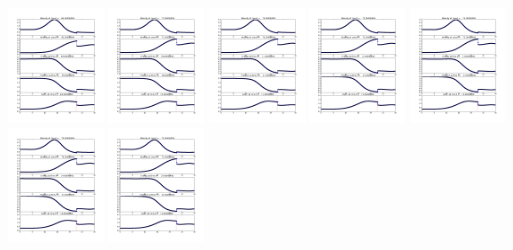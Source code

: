 \documentclass[11pt]{article}
\begin{document}
\vskip 10pt 
\includegraphics[width=0.19\textwidth]{frame0069fig1.png}
\vskip 10pt 
\includegraphics[width=0.19\textwidth]{frame0070fig1.png}
\vskip 10pt 
\includegraphics[width=0.19\textwidth]{frame0071fig1.png}
\vskip 10pt 
\includegraphics[width=0.19\textwidth]{frame0072fig1.png}
\vskip 10pt 
\includegraphics[width=0.19\textwidth]{frame0073fig1.png}
\vskip 10pt 
\includegraphics[width=0.19\textwidth]{frame0074fig1.png}
\vskip 10pt 
\includegraphics[width=0.19\textwidth]{frame0075fig1.png}
\end{document}
